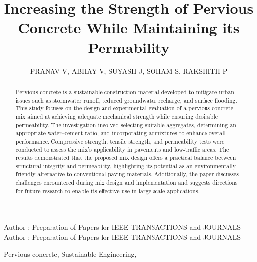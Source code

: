 \documentclass{ieeeaccess}
\begin{document}

\title{Increasing the Strength of Pervious Concrete While Maintaining 
       its Permability}
\author{
    \uppercase{Pranav V}, \uppercase{Abhay V}, 
    \uppercase{Suyash J}, \uppercase{Soham S},
    \uppercase{Rakshith P}
}

\address[1]{Department of Electronics and Communication Engineering,
            RV College of Engineering, Bangalore, India}
\address[1]{Department of Mechanical Engineering,
            RV College of Engineering, Bangalore, India}
\address[1]{Department of Information Science and Engineering,
            RV College of Engineering, Bangalore, India}

\markboth
{Author \headeretal: Preparation of Papers for IEEE TRANSACTIONS and JOURNALS}
{Author \headeretal: Preparation of Papers for IEEE TRANSACTIONS and JOURNALS}



\begin{abstract}
Pervious concrete is a sustainable construction material developed to mitigate
urban issues such as stormwater runoff, reduced groundwater recharge, and
surface flooding. This study focuses on the design and experimental
evaluation of a pervious concrete mix aimed at achieving adequate
mechanical strength while ensuring desirable permeability. The
investigation involved selecting suitable aggregates, determining an
appropriate water–cement ratio, and incorporating admixtures to enhance
overall performance. Compressive strength, tensile strength, and
permeability tests were conducted to assess the mix’s applicability in
pavements and low-traffic areas. The results demonstrated that the proposed
mix design offers a practical balance between structural integrity and
permeability, highlighting its potential as an environmentally friendly
alternative to conventional paving materials. Additionally, the paper
discusses challenges encountered during mix design and implementation and
suggests directions for future research to enable its effective use in
large-scale applications.
\end{abstract}

\begin{keywords}
    Pervious concrete, Sustainable Engineering, 
\end{keywords}
\end{document}
